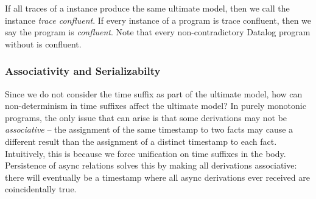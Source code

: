 %

If all traces of a \lang instance produce the same ultimate model, then we
call the instance {\em trace confluent}.  If every instance of a program is
trace confluent, then we say the program is {\em confluent}.  Note that every
non-contradictory Datalog program without  is confluent.

\subsubsection{Associativity and Serializabilty}


Since we do not consider the time suffix as part of the ultimate model, how can
non-determinism in time suffixes affect the ultimate model?  In purely
monotonic programs, the only issue that can arise is that some derivations may
not be {\em associative} -- the assignment of the same timestamp to two facts
may cause a different result than the assignment of a distinct timestamp to
each fact.  Intuitively, this is because we force unification on time suffixes
in the body.  Persistence of async relations  solves this by making all
derivations associative: there will eventually be a timestamp where all async
derivations ever received are coincidentally true.

